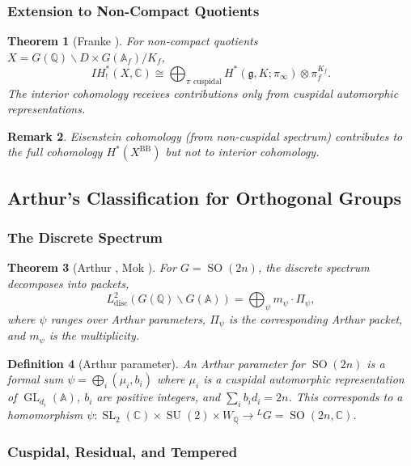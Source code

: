\documentclass[12pt]{amsart}
\newtheorem{theorem}{Theorem}[section]
\newtheorem{definition}[theorem]{Definition}
\newtheorem{remark}[theorem]{Remark}
\theoremstyle{definition}
\DeclareMathOperator\SO{SO}
\DeclareMathOperator\SL{SL}
\DeclareMathOperator\GL{GL}
\DeclareMathOperator\SU{SU}
\newcommand{\A}{\mathbb{A}}
\newcommand{\Q}{\mathbb{Q}}
\newcommand{\C}{\mathbb{C}}
\newcommand{\tensor}{\otimes}
\newcommand{\IH}{\mathit{IH}}
\begin{document}
\subsubsection{Extension to Non-Compact Quotients}

\begin{theorem}[Franke \cite{Franke}]
For non-compact quotients $X = G(\Q) \backslash D \times G(\A_f) / K_f$,
\[
\IH^*_!(X, \C) \cong \bigoplus_{\pi \text{ cuspidal}} H^*({\mathfrak g}, K; \pi_{\infty}) \tensor \pi_f^{K_f}.
\]
The interior cohomology receives contributions only from cuspidal automorphic representations.
\end{theorem}

\begin{remark}
Eisenstein cohomology (from non-cuspidal spectrum) contributes to the full cohomology $H^*(X^{\mathrm{BB}})$ but not to interior cohomology.
\end{remark}

\subsection{Arthur's Classification for Orthogonal Groups}

\subsubsection{The Discrete Spectrum}

\begin{theorem}[Arthur \cite{Arthur}, Mok \cite{Mok}]
For $G = \SO(2n)$, the discrete spectrum decomposes into packets,
\[
L^2_{\mathrm{disc}}(G(\Q) \backslash G(\A)) = \bigoplus_{\psi} m_{\psi} \cdot \Pi_{\psi},
\]
where $\psi$ ranges over Arthur parameters, $\Pi_{\psi}$ is the corresponding Arthur packet, and $m_{\psi}$ is the multiplicity.
\end{theorem}

\begin{definition}[Arthur parameter]
An Arthur parameter for $\SO(2n)$ is a formal sum $\psi = \bigoplus_i (\mu_i, b_i)$ where $\mu_i$ is a cuspidal automorphic representation of $\GL_{d_i}(\A)$, $b_i$ are positive integers, and $\sum_i b_i d_i = 2n$. This corresponds to a homomorphism $\psi \colon \SL_2(\C) \times \SU(2) \times W_{\Q} \to {}^L G = \SO(2n, \C)$.
\end{definition}

\subsubsection{Cuspidal, Residual, and Tempered}
\end{document}
